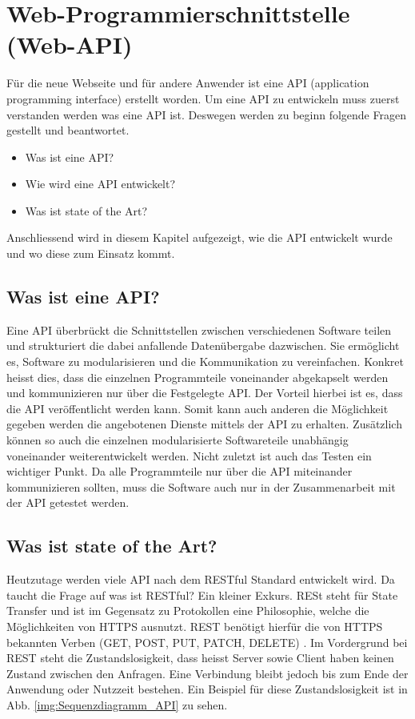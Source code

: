 \section{ Web-Programmierschnittstelle (Web-API)}
Für die neue Webseite und für andere Anwender ist eine API (application programming interface) erstellt worden. Um eine API zu entwickeln muss zuerst verstanden werden was eine API ist. Deswegen werden zu beginn folgende Fragen gestellt und beantwortet.
\begin{itemize}
\item Was ist eine API?
\item Wie wird eine API entwickelt?
\item Was ist state of the Art?
\end{itemize}

Anschliessend wird in diesem Kapitel aufgezeigt, wie die API entwickelt wurde und wo diese zum Einsatz kommt.

\subsection{Was ist eine API?}
Eine API überbrückt die Schnittstellen zwischen verschiedenen Software teilen und strukturiert die dabei anfallende Datenübergabe dazwischen. Sie ermöglicht es, Software zu modularisieren und die Kommunikation zu vereinfachen. Konkret heisst dies, dass die einzelnen Programmteile  voneinander abgekapselt werden und kommunizieren nur über die Festgelegte API. Der Vorteil hierbei ist es, dass die API veröffentlicht werden kann. Somit kann auch anderen die Möglichkeit gegeben werden die angebotenen Dienste mittels der API zu erhalten. Zusätzlich können so auch die einzelnen modularisierte Softwareteile unabhängig voneinander weiterentwickelt werden. Nicht zuletzt ist auch das Testen ein wichtiger Punkt. Da alle Programmteile nur über die API miteinander kommunizieren sollten, muss die Software auch nur in der Zusammenarbeit mit der API getestet werden.

\subsection{Was ist state of the Art?}
Heutzutage werden viele API nach dem RESTful Standard entwickelt wird. Da taucht die Frage auf was ist RESTful? Ein kleiner Exkurs. RESt steht für State Transfer und ist im Gegensatz zu Protokollen eine Philosophie, welche die Möglichkeiten von HTTPS ausnutzt. REST benötigt hierfür die von HTTPS bekannten Verben (GET, POST, PUT, PATCH, DELETE) \cite{LornaJaneMitchell2013oreilly}. Im Vordergrund bei REST steht die Zustandslosigkeit, dass heisst Server sowie Client haben keinen Zustand zwischen den Anfragen. Eine Verbindung bleibt jedoch bis zum Ende der Anwendung oder Nutzzeit bestehen. Ein Beispiel für diese Zustandslosigkeit ist in Abb. \ref{img:Sequenzdiagramm_API} zu sehen.\\

